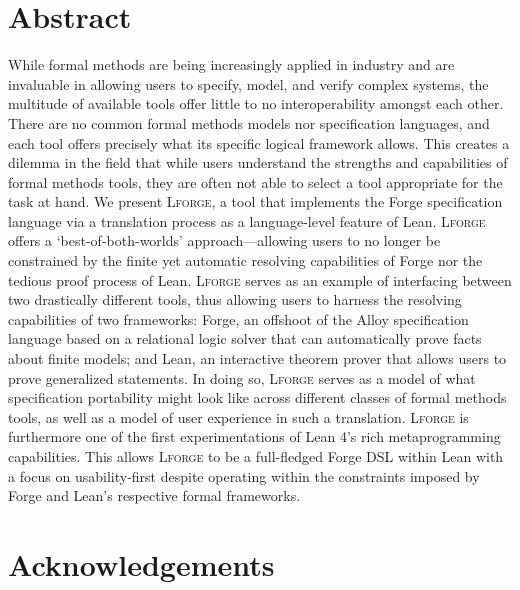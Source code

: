 \newpage
\section*{Abstract}
While formal methods are being increasingly applied in industry and are invaluable in allowing users to specify, model, and verify complex systems, the multitude of available tools offer little to no interoperability amongst each other. 
There are no common formal methods models nor specification languages, and each tool offers precisely what its specific logical framework allows. 
This creates a dilemma in the field that while users understand the strengths and capabilities of formal methods tools, they are often not able to select a tool appropriate for the task at hand. 
We present \textsc{Lforge}, a tool that implements the Forge specification language via a translation process as a language-level feature of Lean. 
\textsc{Lforge} offers a `best-of-both-worlds' approach---allowing users to no longer be constrained by the finite yet automatic resolving capabilities of Forge nor the tedious proof process of Lean.
\textsc{Lforge} serves as an example of interfacing between two drastically different tools, thus allowing users to harness the resolving capabilities of two frameworks: Forge, an offshoot of the Alloy specification language based on a relational logic solver that can automatically prove facts about finite models; and Lean, an interactive theorem prover that allows users to prove generalized statements. 
In doing so, \textsc{Lforge} serves as a model of what specification portability might look like across different classes of formal methods tools, as well as a model of user experience in such a translation. 
\textsc{Lforge} is furthermore one of the first experimentations of Lean 4's rich metaprogramming capabilities. This allows \textsc{Lforge} to be a full-fledged Forge DSL within Lean with a focus on usability-first despite operating within the constraints imposed by Forge and Lean's respective formal frameworks. 

\newpage
\section*{Acknowledgements}

\vfill

